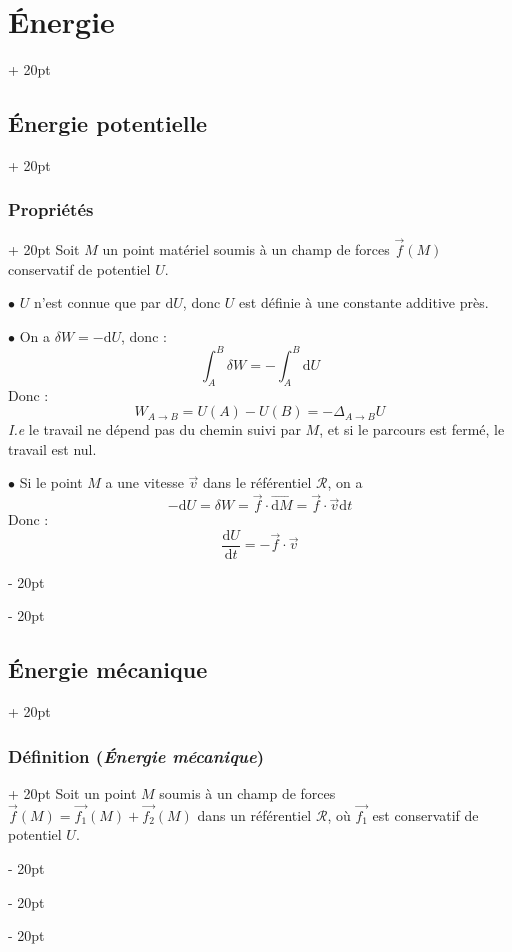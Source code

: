 \documentclass[a4paper, 12pt, twoside]{article}
\newcommand{\dt}[2][t]{\dfrac{\mathrm d #2}{\mathrm d #1}} %
\newcommand{\vect}{\overrightarrow}
\newcommand{\ind}[1][20pt]{\advance\leftskip + #1}
\newcommand{\deind}[1][20pt]{\advance\leftskip - #1}
\newenvironment{indt}[2][20pt]{#2 \par \ind[#1]}{\par \deind} %
\begin{document}
\begin{indt}{\section{\'Energie}}
\begin{indt}{\subsection{Énergie potentielle}}
            \vspace{12pt}
            
            \begin{indt}{\subsubsection{Propriétés}}
                Soit $M$ un point matériel soumis à un champ de forces $\vec f(M)$ conservatif de potentiel $U$.

                \vspace{6pt}
                
                $\bullet$ $U$ n'est connue que par $\mathrm dU$, donc $U$ est définie à une constante additive près.

                \vspace{6pt}
                
                $\bullet$ On a $\delta W = -\mathrm dU$, donc :
                \[
                    \int_A^B \delta W = -\int_A^B \mathrm dU
                \]
                Donc :
                \[
                    W_{A \to B} = U(A) - U(B)
                    = - \Delta_{A \to B} U
                \]
                \textit{I.e} le travail ne dépend pas du chemin suivi par $M$, et si le parcours est fermé, le travail est nul.

                \vspace{6pt}
                
                $\bullet$ Si le point $M$ a une vitesse $\vec v$ dans le référentiel $\mathscr R$, on a
                \[
                    -\mathrm dU = \delta W
                    = \vec f \cdot \vect{\mathrm dM}
                    = \vec f \cdot \vec v \mathrm dt
                \]
                Donc :
                \[
                    \dt U = -\vec f \cdot \vec v
                \]
            \end{indt}
        \end{indt}

        \vspace{12pt}
        
        \begin{indt}{\subsection{Énergie mécanique}}
            \begin{indt}{\subsubsection{Définition (\textit{\'Energie mécanique})}}
                Soit un point $M$ soumis à un champ de forces $\vec f(M) = \vec{f_1}(M) + \vec{f_2}(M)$ dans un référentiel $\mathscr R$, où $\vec{f_1}$ est conservatif de potentiel $U$.


\end{indt}
\end{indt}
\end{indt}
\end{document}
